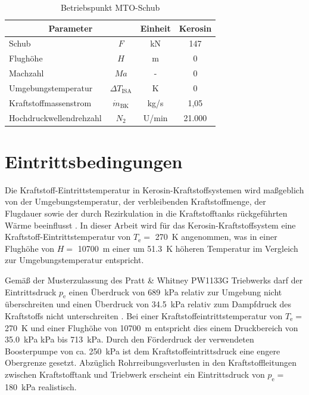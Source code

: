 \begin{table}[ht]
    \centering
	\caption{Betriebspunkt MTO-Schub}
	\begin{tabular} {|l|c|c|c|} \hline%
    \multicolumn{2}{|c|}{Parameter} & Einheit & Kerosin \\ \hline\hline%
    Schub & $F$ & kN & 147 \\ \hline
    Flughöhe & $H$ & m & 0 \\ \hline
    Machzahl & $Ma$ & - & 0 \\ \hline
    Umgebungstemperatur & $\Delta T_\mathrm{ISA}$ & K & 0 \\ \hline\hline
    Kraftstoffmassenstrom & $\dot{m}_\mathrm{BK}$& kg/s & 1,05  \\ \hline
    Hochdruckwellendrehzahl & $N_2$ & U/min & 21.000 \\ \hline
    \end{tabular}	
    \label{Tab:mto}%
\end{table}
\FloatBarrier 

\section{Eintrittsbedingungen}

Die Kraftstoff-Eintrittstemperatur in Kerosin-Kraftstoffsystemen wird maßgeblich von der Umgebungstemperatur, der verbleibenden Kraftstoffmenge, der Flugdauer sowie der durch Rezirkulation in die Kraftstofftanks rückgeführten Wärme beeinflusst \cite{German.2012}. In dieser Arbeit wird für das Kerosin-Kraftstoffsystem eine Kraftstoff-Eintrittstemperatur von $T_\mathrm{e}=$ \SI{270}{\K} angenommen, was in einer Flughöhe von $H= $ \SI{10700}{\m} einer um \SI{51.3}{\K} höheren Temperatur im Vergleich zur Umgebungstemperatur entspricht. 

Gemäß der Musterzulassung des Pratt \& Whitney PW1133G Triebwerks darf der Eintrittsdruck $p_\mathrm{e}$ einen Überdruck von \SI{689}{\kilo\Pa} relativ zur Umgebung nicht überschreiten und einen Überdruck von \SI{34.5}{\kilo\Pa} relativ zum Dampfdruck des Kraftstoffs nicht unterschreiten \cite{EASA.2018}. Bei einer Kraftstoffeintrittstemperatur von $T_\mathrm{e}=$ \SI{270}{\K} und einer Flughöhe von \SI{10700}{\m} entspricht dies einem Druckbereich von \SI{35.0}{\kilo\Pa} kPa bis \SI{713}{\kilo\Pa}. Durch den Förderdruck der verwendeten Boosterpumpe von ca. \SI{250}{\kilo\Pa} \cite{EatonFuelSystemsDivision.2013} ist dem Kraftstoffeintrittsdruck eine engere Obergrenze gesetzt. Abzüglich Rohrreibungsverlusten in den Kraftstoffleitungen zwischen Kraftstofftank und Triebwerk erscheint ein Eintrittsdruck von $p_\mathrm{e}=$ \SI{180}{\kilo\Pa} realistisch.

